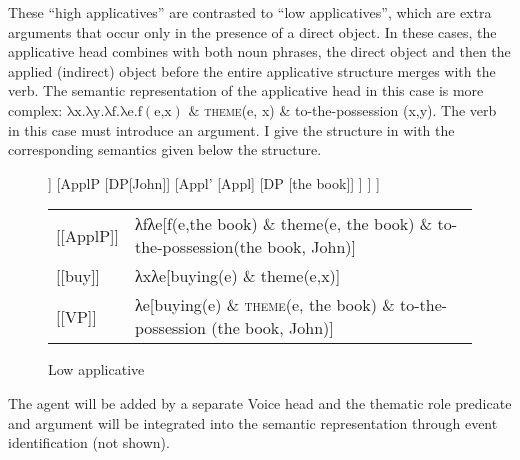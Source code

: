 \documentclass[output=paper,colorlinks,citecolor=brown,modfonts,nonflat]{langsci/langscibook}
\begin{document}

These ``high applicatives'' are contrasted to ``low applicatives'', which are extra arguments that occur only in the presence of a direct object. In these cases, the applicative head combines with both noun phrases, the direct object and then the applied (indirect) object before the entire applicative structure merges with the verb. The semantic representation of the applicative head in this case is more complex:  $\text{λx.λy.λf.λe}\text{.f}\left(\text{e,x}\right)\text{ \&} $  \textsc{theme}(e, x) \& to-the-possession (x,y). The verb in this case must introduce an argument. I give the structure in  with the corresponding semantics given below the structure.


\begin{figure}
	\begin{forest}
		[VP
			[V [buy]]
			[ApplP
				[DP[John]]
				[Appl'
					[Appl]
					[DP [the book]]
				]
			]
		]
	\end{forest}

	\begin{tabular}{l p{8cm}}
		{[}{[}ApplP{]}{]}  &  λfλe{[}f(e,the book) \& theme(e, the book) \& to-the-possession(the book, John){]}\\
		{[}{[}buy{]}{]} &  λxλe{[}buying(e) \& theme(e,x){]}\\
		{[}{[}VP{]}{]} &  λe{[}buying(e) \& \textsc{theme}(e, the book) \& to-the-possession (the book, John){]}
	\end{tabular}

	\caption{\label{fig:basilico:2} Low applicative}
\end{figure}


\largerpage
The agent will be added by a separate Voice head and the thematic role predicate and argument will be integrated into the semantic representation through event identification (not shown).
\end{document}
